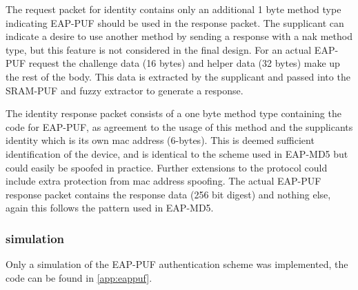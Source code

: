 The request packet for identity contains only an additional 1 byte method type
indicating EAP-PUF should be used in the response packet. The supplicant can
indicate a desire to use another method by sending a response with a \gls{nak}
method type, but this feature is not considered in the final design.
For an actual EAP-PUF request the challenge data (16 bytes)
and helper data (32 bytes) make up the rest of the body.
This data is extracted by the supplicant and passed into the SRAM-PUF and fuzzy
extractor to generate a response.

The identity response packet consists of a one byte method type containing the code
for EAP-PUF, as agreement to the usage of this method and the supplicants
identity which is its own \gls{mac} address (6-bytes). This is deemed sufficient
identification of the device, and is identical to the scheme used in EAP-MD5
but could easily be spoofed in practice. Further extensions to the
protocol could include extra protection from \gls{mac} address spoofing.
The actual EAP-PUF response packet contains the response data (256 bit digest)
and nothing else, again this follows the pattern used in EAP-MD5.

\subsubsection{simulation}

Only a simulation of the EAP-PUF authentication scheme was implemented, the
code can be found in \autoref{app:eappuf}.

